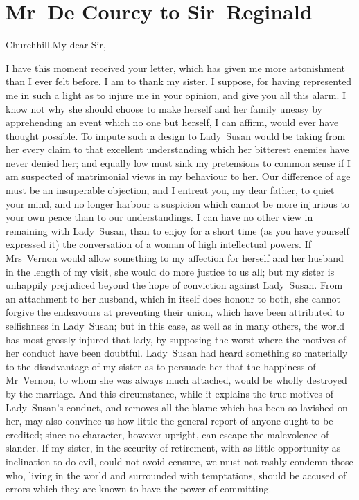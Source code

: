 \chapter{Mr~De Courcy to Sir~Reginald}
  
  \begin{mail}{Churchhill.}{My dear Sir,}

I have this moment received your letter, which has given me more astonishment than I ever felt before. I am to thank my sister, I suppose, for having represented me in such a light as to injure me in your opinion, and give you all this alarm. I know not why she should choose to make herself and her family uneasy by apprehending an event which no one but herself, I can affirm, would ever have thought possible. To impute such a design to Lady~Susan would be taking from her every claim to that excellent understanding which her bitterest enemies have never denied her; and equally low must sink my pretensions to common sense if I am suspected of matrimonial views in my behaviour to her. Our difference of age must be an insuperable objection, and I entreat you, my dear father, to quiet your mind, and no longer harbour a suspicion which cannot be more injurious to your own peace than to our understandings. I can have no other view in remaining with Lady~Susan, than to enjoy for a short time (as you have yourself expressed it) the conversation of a woman of high intellectual powers. If Mrs~Vernon would allow something to my affection for herself and her husband in the length of my visit, she would do more justice to us all; but my sister is unhappily prejudiced beyond the hope of conviction against Lady~Susan. From an attachment to her husband, which in itself does honour to both, she cannot forgive the endeavours at preventing their union, which have been attributed to selfishness in Lady~Susan; but in this case, as well as in many others, the world has most grossly injured that lady, by supposing the worst where the motives of her conduct have been doubtful. Lady~Susan had heard something so materially to the disadvantage of my sister as to persuade her that the happiness of Mr~Vernon, to whom she was always much attached, would be wholly destroyed by the marriage. And this circumstance, while it explains the true motives of Lady~Susan's conduct, and removes all the blame which has been so lavished on her, may also convince us how little the general report of anyone ought to be credited; since no character, however upright, can escape the malevolence of slander. If my sister, in the security of retirement, with as little opportunity as inclination to do evil, could not avoid censure, we must not rashly condemn those who, living in the world and surrounded with temptations, should be accused of errors which they are known to have the power of committing.


\end{mail}
